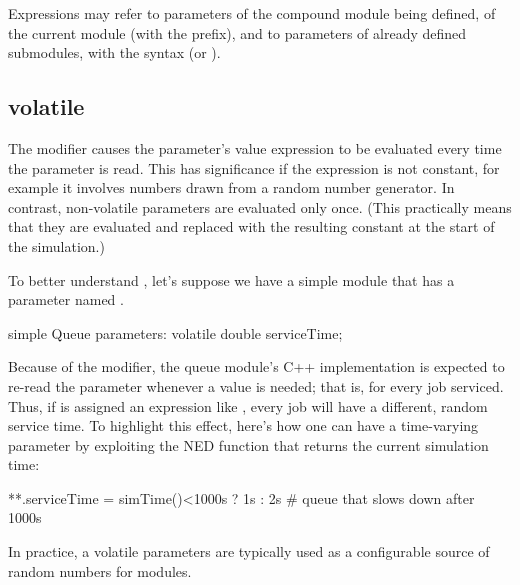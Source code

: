 
Expressions may refer to parameters of the compound module being defined,
of the current module (with the  prefix), and to parameters
of already defined submodules, with the syntax 
(or ).




\subsection{volatile}
\label{sec:ned-lang:volatile}

The  modifier causes the parameter's value expression to
be evaluated every time the parameter is read. This has significance if the
expression is not constant, for example it involves numbers drawn from a
random number generator. In contrast, non-volatile parameters are evaluated
only once. (This practically means that they are evaluated and replaced
with the resulting constant at the start of the simulation.)

To better understand , let's suppose we have a
 simple module that has a  parameter
named .

\begin{ned}
simple Queue
{
    parameters:
        volatile double serviceTime;
}
\end{ned}

Because of the  modifier, the queue module's C++
implementation is expected to re-read the  parameter
whenever a value is needed; that is, for every job serviced. Thus, if
 is assigned an expression like ,
every job will have a different, random service time. To highlight this
effect, here's how one can have a time-varying parameter by exploiting
the  NED function that returns the current simulation time:

\begin{inifile}
**.serviceTime = simTime()<1000s ? 1s : 2s  # queue that slows down after 1000s
\end{inifile}

In practice, a volatile parameters are typically used as a configurable
source of random numbers for modules.

